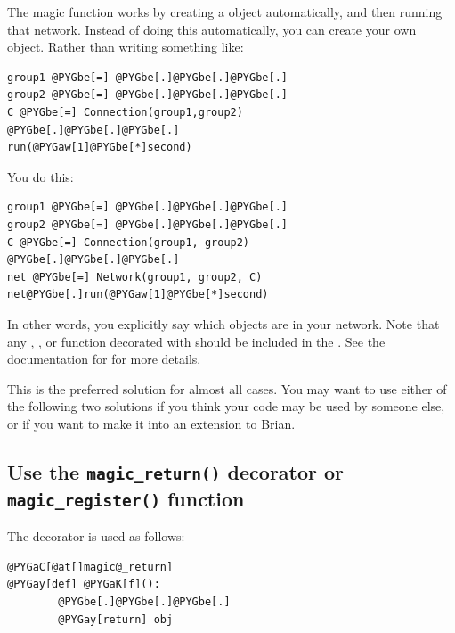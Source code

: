 \documentclass[letterpaper,10pt,english]{manual}
\begin{document}
The magic \hyperlink{brian.run}{} function works by creating a \hyperlink{brian.Network}{}
object automatically, and then running that network. Instead of doing
this automatically, you can create your own \hyperlink{brian.Network}{} object.
Rather than writing something like:

\begin{Verbatim}[commandchars=@\[\]]
group1 @PYGbe[=] @PYGbe[.]@PYGbe[.]@PYGbe[.]
group2 @PYGbe[=] @PYGbe[.]@PYGbe[.]@PYGbe[.]
C @PYGbe[=] Connection(group1,group2)
@PYGbe[.]@PYGbe[.]@PYGbe[.]
run(@PYGaw[1]@PYGbe[*]second)
\end{Verbatim}

You do this:

\begin{Verbatim}[commandchars=@\[\]]
group1 @PYGbe[=] @PYGbe[.]@PYGbe[.]@PYGbe[.]
group2 @PYGbe[=] @PYGbe[.]@PYGbe[.]@PYGbe[.]
C @PYGbe[=] Connection(group1, group2)
@PYGbe[.]@PYGbe[.]@PYGbe[.]
net @PYGbe[=] Network(group1, group2, C)
net@PYGbe[.]run(@PYGaw[1]@PYGbe[*]second)
\end{Verbatim}

In other words, you explicitly say which objects are in your network.
Note that any \hyperlink{brian.NeuronGroup}{}, \hyperlink{brian.Connection}{},  or
function decorated with \hyperlink{brian.network_operation}{} should be included in the
\hyperlink{brian.Network}{}. See the documentation for \hyperlink{brian.Network}{} for more details.

This is the preferred solution for almost all cases. You may want to use either
of the following two solutions if you think your code may be used by someone
else, or if you want to make it into an extension to Brian.

\subsection{Use the \texttt{magic\_return()} decorator or \texttt{magic\_register()} function}

The \hyperlink{brian.magic_return}{} decorator is used as follows:

\begin{Verbatim}[commandchars=@\[\]]
@PYGaC[@at[]magic@_return]
@PYGay[def] @PYGaK[f]():
        @PYGbe[.]@PYGbe[.]@PYGbe[.]
        @PYGay[return] obj
\end{Verbatim}
\end{document}
